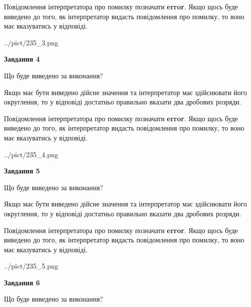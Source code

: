 \documentclass[12pt, ukrainian]{article}
\begin{document}
{\begin {Large}
Повідомлення інтерпретатора про помилку позначати \textbf{error}.
Якщо щось буде виведено до того, як інтерпретатор видасть повідомлення про помилку, 
то воно має вказуватись у відповіді. \par

\begin{center}
	{../pict/235_3.png}
\end{center}
\newpage

{\begin {center}\textbf{Завдання 4}\end {center}}\par
Що буде виведено за виконання? \par

Якщо має бути виведено дійсне значення та інтерпретатор має здійснювати його округлення, 
то у відповіді достатньо правильно вказати два дробових розряди.

Повідомлення інтерпретатора про помилку позначати \textbf{error}.
Якщо щось буде виведено до того, як інтерпретатор видасть повідомлення про помилку, 
то воно має вказуватись у відповіді. \par

\begin{center}
	{../pict/235_4.png}
\end{center}
\newpage

{\begin {center}\textbf{Завдання 5}\end {center}}\par
Що буде виведено за виконання? \par

Якщо має бути виведено дійсне значення та інтерпретатор має здійснювати його округлення, 
то у відповіді достатньо правильно вказати два дробових розряди.

Повідомлення інтерпретатора про помилку позначати \textbf{error}.
Якщо щось буде виведено до того, як інтерпретатор видасть повідомлення про помилку, 
то воно має вказуватись у відповіді. \par

\begin{center}
	{../pict/235_5.png}
\end{center}
\newpage

{\begin {center}\textbf{Завдання 6}\end {center}}\par
Що буде виведено за виконання? \par


\end{Large}}
\end{document}
